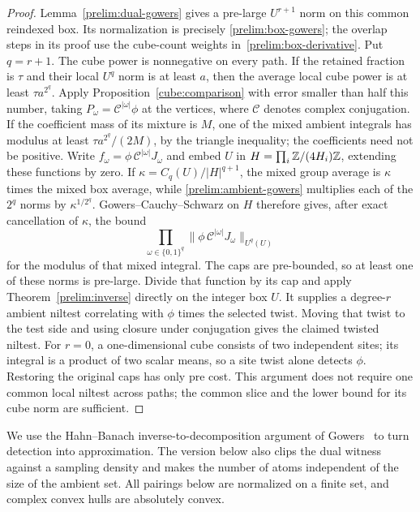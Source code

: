 \begin{proof}
Lemma~\ref{prelim:dual-gowers} gives a pre-large $U^{r+1}$ norm on
this common reindexed box.  Its normalization is precisely
\eqref{prelim:box-gowers}; the overlap steps in its proof use the
cube-count weights in~\eqref{prelim:box-derivative}.  Put $q=r+1$.
The cube power is nonnegative on every path.  If the retained fraction is
$\tau$ and their local $U^q$ norm is at least $a$, then the average
local cube power is at least $\tau a^{2^q}$.  Apply
Proposition~\ref{cube:comparison} with error smaller than half this
number, taking $P_\omega=\mathcal C^{|\omega|}\phi$ at the vertices,
where $\mathcal C$ denotes complex conjugation.  If the coefficient
mass of its mixture is $M$, one of the mixed ambient integrals has
modulus at least $\tau a^{2^q}/(2M)$, by the triangle inequality;
the coefficients need not be positive.  Write
$f_\omega=\phi\,\mathcal C^{|\omega|}J_\omega$ and embed $U$ in
$H=\prod_i\mathbb Z/(4H_i)\mathbb Z$, extending these functions by zero.
If $\kappa=C_q(U)/|H|^{q+1}$, the mixed group average is $\kappa$
times the mixed box average, while
\eqref{prelim:ambient-gowers} multiplies each of the $2^q$ norms
by $\kappa^{1/2^q}$.  Gowers--Cauchy--Schwarz on $H$ therefore gives,
after exact cancellation of $\kappa$, the bound
\[
                  \prod_{\omega\in\{0,1\}^q}
          \|\phi\,\mathcal C^{|\omega|}J_\omega\|_{U^q(U)}
\]
for the modulus of that mixed integral.
The caps are pre-bounded, so at least one of these norms is
pre-large.  Divide that function by its cap and apply
Theorem~\ref{prelim:inverse} directly on the integer box $U$.
It supplies a degree-$r$ ambient niltest correlating with $\phi$
times the selected twist.  Moving that twist to the test side and
using closure under conjugation gives the claimed twisted niltest.
For $r=0$, a one-dimensional cube consists of two
independent sites; its integral is a product of two scalar means,
so a site twist alone detects $\phi$.  Restoring the original caps
has only pre cost.  This argument
does not require one common local niltest across paths; the common
slice and the lower bound for its cube norm are sufficient.
\end{proof}

We use the Hahn--Banach inverse-to-decomposition argument
of Gowers~\cite[Section~3.2]{GowersHahnBanach2010} to turn detection
into approximation. The version below also clips the dual witness
against a sampling density and makes the number of atoms independent
of the size of the ambient set. All pairings below are
normalized on a finite set, and complex convex hulls are absolutely
convex.

